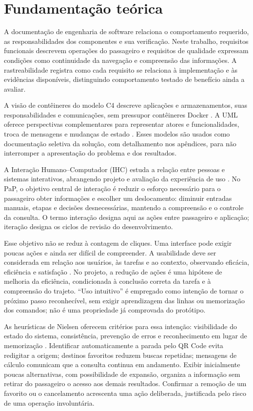 \documentclass[12pt,oneside,a4paper,brazil,chapter=TITLE]{abntex2}
\let\papsection\section
\renewcommand{\section}{\clearpage\papsection}
\begin{document}
\section{Fundamentação teórica}

A documentação de engenharia de software relaciona o comportamento requerido, as responsabilidades dos componentes e sua verificação. Neste trabalho, requisitos funcionais descrevem operações do passageiro e requisitos de qualidade expressam condições como continuidade da navegação e compreensão das informações. A rastreabilidade registra como cada requisito se relaciona à implementação e às evidências disponíveis, distinguindo comportamento testado de benefício ainda a avaliar.

A visão de contêineres do modelo C4 descreve aplicações e armazenamentos, suas responsabilidades e comunicações, sem pressupor contêineres Docker \citep{c4container}. A UML oferece perspectivas complementares para representar atores e funcionalidades, troca de mensagens e mudanças de estado \citep{uml251}. Esses modelos são usados como documentação seletiva da solução, com detalhamento nos apêndices, para não interromper a apresentação do problema e dos resultados.

A Interação Humano--Computador (IHC) estuda a relação entre pessoas e sistemas interativos, abrangendo projeto e avaliação da experiência de uso \citep{barbosa2021}. No PaP, o objetivo central de interação é reduzir o esforço necessário para o passageiro obter informações e escolher um deslocamento: diminuir entradas manuais, etapas e decisões desnecessárias, mantendo a compreensão e o controle da consulta. O termo interação designa aqui as ações entre passageiro e aplicação; iteração designa os ciclos de revisão do desenvolvimento.

Esse objetivo não se reduz à contagem de cliques. Uma interface pode exigir poucas ações e ainda ser difícil de compreender. A usabilidade deve ser considerada em relação aos usuários, às tarefas e ao contexto, observando eficácia, eficiência e satisfação \citep{iso924111}. No projeto, a redução de ações é uma hipótese de melhoria da eficiência, condicionada à conclusão correta da tarefa e à compreensão do trajeto. ``Uso intuitivo'' é empregado como intenção de tornar o próximo passo reconhecível, sem exigir aprendizagem das linhas ou memorização dos comandos; não é uma propriedade já comprovada do protótipo.

As heurísticas de Nielsen oferecem critérios para essa intenção: visibilidade do estado do sistema, consistência, prevenção de erros e reconhecimento em lugar de memorização \citep{nielsen1994}. Identificar automaticamente a parada pelo QR Code evita redigitar a origem; destinos favoritos reduzem buscas repetidas; mensagens de cálculo comunicam que a consulta continua em andamento. Exibir inicialmente poucas alternativas, com possibilidade de expansão, organiza a informação sem retirar do passageiro o acesso aos demais resultados. Confirmar a remoção de um favorito ou o cancelamento acrescenta uma ação deliberada, justificada pelo risco de uma operação involuntária.
\end{document}
